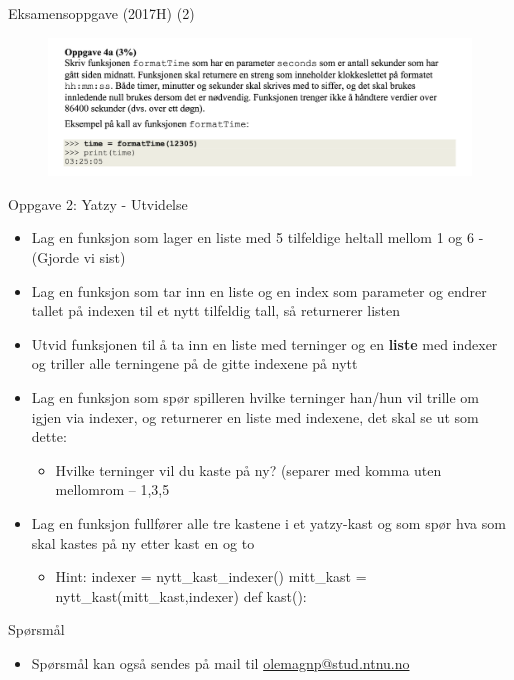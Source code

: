 \documentclass[screen, aspectratio=169]{beamer}
\begin{document}
\begin{frame}{Eksamensoppgave (2017H) (2)}
    \begin{figure}
        \centering
        \includegraphics[width=\textwidth]{fig/time_2017.png}
        \label{fig:my_label}
    \end{figure}
    
\end{frame}

\begin{frame}{Oppgave 2: Yatzy - Utvidelse}
	\begin{itemize}
		\item<+-> Lag en funksjon som lager en liste med 5 tilfeldige heltall mellom 1 og 6 - (Gjorde vi sist)
	
		\item<+-> Lag en funksjon som tar inn en liste og en index som parameter og endrer tallet på indexen til et nytt tilfeldig tall, så returnerer listen

		\item<+-> Utvid funksjonen til å ta inn en liste med terninger og en \textbf{liste} med indexer og triller alle terningene på de gitte indexene på nytt

		\item<+->  Lag en funksjon som spør spilleren hvilke terninger han/hun vil trille om igjen via indexer, og returnerer en liste med indexene, det skal se ut som dette:
		\begin{itemize}
    \item   Hvilke terninger vil du kaste på ny? (separer med komma uten mellomrom – 1,3,5
    \end{itemize}
    \item<+-> Lag en funksjon fullfører alle tre kastene i et yatzy-kast og som spør hva som skal kastes på ny etter kast en og to
    \begin{itemize}
        \item Hint: indexer = nytt\_kast\_indexer()
	mitt\_kast = nytt\_kast(mitt\_kast,indexer)
	def kast():

    \end{itemize}

	\end{itemize}
\end{frame}



\begin{frame}{Spørsmål}
	\begin{itemize}
		\item Spørsmål kan også sendes på mail til \href{mailto::olemagnp@stud.ntnu.no}{olemagnp@stud.ntnu.no}
	\end{itemize}
\end{frame}
\end{document}
